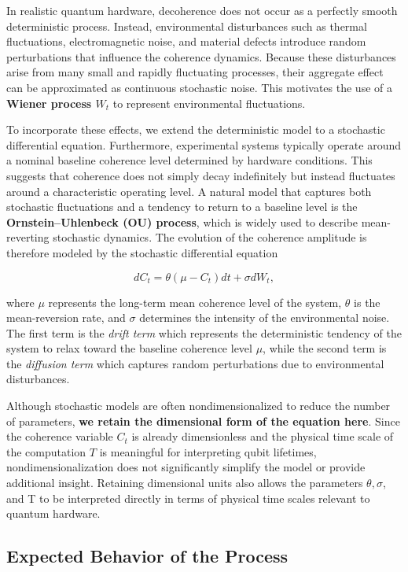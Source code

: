 \documentclass[
	a4paper, %
	10pt, %
	unnumberedsections, %
	twoside, %
]{LTJournalArticle}
\def\[{ \begin{equation} }
\def\]{ \end{equation} }
\begin{document}
In realistic quantum hardware, decoherence does not occur as a perfectly smooth deterministic process. Instead, environmental disturbances such as thermal fluctuations, electromagnetic noise, and material defects introduce random perturbations that influence the coherence dynamics. Because these disturbances arise from many small and rapidly fluctuating processes, their aggregate effect can be approximated as continuous stochastic noise. This motivates the use of a \textbf{Wiener process $W_t$} to represent environmental fluctuations.

To incorporate these effects, we extend the deterministic model to a stochastic differential equation. Furthermore, experimental systems typically operate around a nominal baseline coherence level determined by hardware conditions. This suggests that coherence does not simply decay indefinitely but instead fluctuates around a characteristic operating level. A natural model that captures both stochastic fluctuations and a tendency to return to a baseline level is the \textbf{Ornstein--Uhlenbeck (OU) process}, which is widely used to describe mean-reverting stochastic dynamics.
The evolution of the coherence amplitude is therefore modeled by the stochastic differential equation \autocite{HolmesCerfon2026ODE}

\[
dC_t=\theta(\mu - C_t)dt+ \sigma dW_t,
\]

where $\mu$
represents the long-term mean coherence level of the system, $\theta$ is the mean-reversion rate, and $\sigma$ determines the intensity of the environmental noise. The first term is the \textit{drift term} which represents the deterministic tendency of the system to relax toward the baseline coherence level $\mu$, while the second term is the \textit{diffusion term} which captures random perturbations due to environmental disturbances.

Although stochastic models are often nondimensionalized to reduce the number of parameters, \textbf{we retain the dimensional form of the equation here}. Since the coherence variable $C_t$ is already dimensionless and the physical time scale of the computation $T$ is meaningful for interpreting qubit lifetimes, nondimensionalization does not significantly simplify the model or provide additional insight. Retaining dimensional units also allows the parameters $\theta, \sigma$, and T to be interpreted directly in terms of physical time scales relevant to quantum hardware.

\subsection{Expected Behavior of the Process}
\end{document}
